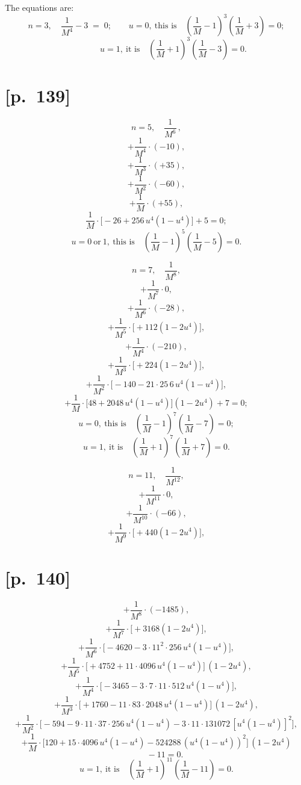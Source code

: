 \documentclass[11pt]{article}
\begin{document}
The equations are:
\[
n = 3,\quad
\frac{1}{M^4} - 3 \;=\; 0; \qquad u = 0,\ \text{this is}\quad \left(\frac{1}{M} - 1\right)^{\!3}\!\left(\frac{1}{M} + 3\right) = 0;
\]
\[
\qquad\qquad u = 1,\ \text{it is}\quad \left(\frac{1}{M} + 1\right)^{\!3}\!\left(\frac{1}{M} - 3\right) = 0.
\]

\section*{[p.~139]}

\[
n = 5,\quad \frac{1}{M^6}\,,
\]
\[
+ \frac{1}{M^4}\cdot(-10),
\]
\[
+ \frac{1}{M^3}\cdot(+35),
\]
\[
+ \frac{1}{M^2}\cdot(-60),
\]
\[
+ \frac{1}{M}\cdot(+55),
\]
\[
\frac{1}{M}\cdot\bigl[-26 + 256\,u^4(1 - u^4)\bigr] + 5 = 0;
\]
\[
u = 0\ \text{or}\ 1,\ \text{this is}\quad \left(\frac{1}{M} - 1\right)^{\!5}\!\left(\frac{1}{M} - 5\right) = 0.
\]

\[
n = 7,\quad \frac{1}{M^8},
\]
\[
+ \frac{1}{M^7}\cdot 0,
\]
\[
+ \frac{1}{M^6}\cdot(-28),
\]
\[
+ \frac{1}{M^5}\cdot\bigl[+112(1 - 2u^4)\bigr],
\]
\[
+ \frac{1}{M^4}\cdot(-210),
\]
\[
+ \frac{1}{M^3}\cdot\bigl[+224(1 - 2u^4)\bigr],
\]
\[
+ \frac{1}{M^2}\cdot\bigl[-140 - 21\cdot 25\,6\,u^4(1 - u^4)\bigr],
\]
\[
+ \frac{1}{M}\cdot\bigl[48 + 2048\,u^4(1 - u^4)\bigr](1 - 2u^4) + 7 = 0;
\]
\[
u = 0,\ \text{this is}\quad \left(\frac{1}{M} - 1\right)^{\!7}\!\left(\frac{1}{M} - 7\right) = 0;
\]
\[
u = 1,\ \text{it is}\quad \left(\frac{1}{M} + 1\right)^{\!7}\!\left(\frac{1}{M} + 7\right) = 0.
\]

\[
n = 11,\quad \frac{1}{M^{12}},
\]
\[
+ \frac{1}{M^{11}}\cdot 0,
\]
\[
+ \frac{1}{M^{10}}\cdot(-66),
\]
\[
+ \frac{1}{M^9}\cdot\bigl[+440(1 - 2u^4)\bigr],
\]

\section*{[p.~140]}

\[
+ \frac{1}{M^8}\cdot(-1485),
\]
\[
+ \frac{1}{M^7}\cdot\bigl[+3168(1 - 2u^4)\bigr],
\]
\[
+ \frac{1}{M^6}\cdot\bigl[-4620 - 3\cdot 11^2\cdot 256\,u^4(1 - u^4)\bigr],
\]
\[
+ \frac{1}{M^5}\cdot\bigl[+4752 + 11\cdot 4096\,u^4(1 - u^4)\bigr]\,(1 - 2u^4),
\]
\[
+ \frac{1}{M^4}\cdot\bigl[-3465 - 3\cdot 7\cdot 11\cdot 512\,u^4(1 - u^4)\bigr],
\]
\[
+ \frac{1}{M^3}\cdot\bigl[+1760 - 11\cdot 83\cdot 2048\,u^4(1 - u^4)\bigr]\,(1 - 2u^4),
\]
\[
+ \frac{1}{M^2}\cdot\bigl[-594 - 9\cdot 11\cdot 37\cdot 256\,u^4(1 - u^4) - 3\cdot 11\cdot 131072\,[u^4(1 - u^4)]^2\bigr],
\]
\[
+ \frac{1}{M}\cdot\bigl[120 + 15\cdot 4096\,u^4(1 - u^4) - 524288\,(u^4(1 - u^4))^2\bigr]\,(1 - 2u^4)
\]
\[
\qquad - 11 = 0.
\]
\[
u = 1,\ \text{it is}\quad \left(\frac{1}{M} + 1\right)^{\!11}\!\left(\frac{1}{M} - 11\right) = 0.
\]
\end{document}

